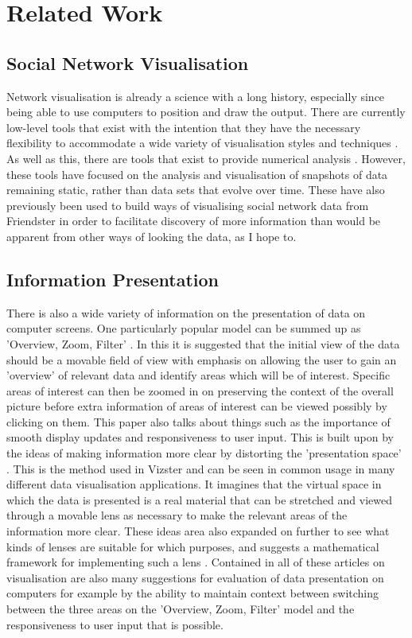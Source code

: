 \documentclass[12pt,a4paper]{article}
\begin{document}
\section{Related Work}

\subsection{Social Network Visualisation}
Network visualisation is already a science with a long history, especially since being able to use computers to position and draw the output. There are currently low-level tools that exist with the intention that they have the necessary flexibility to accommodate a wide variety of visualisation styles and techniques \cite{heer2005prefuse}. As well as this, there are tools that exist to provide numerical analysis \cite{borgatti2002ucinet}. However, these tools have focused on the analysis and visualisation of snapshots of data remaining static, rather than data sets that evolve over time. These have also previously been used to build ways of visualising social network data from Friendster \cite{heer2005vizster} in order to facilitate discovery of more information than would be apparent from other ways of looking the data, as I hope to.

\subsection{Information Presentation}
There is also a wide variety of information on the presentation of data on computer screens. One particularly popular model can be summed up as 'Overview, Zoom, Filter' \cite{shneiderman1996eyes}. In this it is suggested that the initial view of the data should be a movable field of view with emphasis on allowing the user to gain an 'overview' of relevant data and identify areas which will be of interest. Specific areas of interest can then be zoomed in on preserving the context of the overall picture before extra information of areas of interest can be viewed possibly by clicking on them. This paper also talks about things such as the importance of smooth display updates and responsiveness to user input. This is built upon by the ideas of making information more clear by distorting the 'presentation space' \cite{carpendale2001framework}. This is the method used in Vizster and can be seen in common usage in many different data visualisation applications. It imagines that the virtual space in which the data is presented is a real material that can be stretched and viewed through a movable lens as necessary to make the relevant areas of the information more clear. These ideas area also expanded on further to see what kinds of lenses are suitable for which purposes, and suggests a mathematical framework for implementing such a lens \cite{leung1994review}. Contained in all of these articles on visualisation are also many suggestions for evaluation of data presentation on computers for example by the ability to maintain context between switching between the three areas on the 'Overview, Zoom, Filter' model and the responsiveness to user input that is possible.
\end{document}
